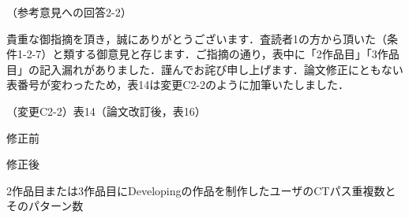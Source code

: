 \documentclass{jarticle} %
\def\subsection#1{ \vspace{1pc} {\gt #1} }
\begin{document}
\subsection{（参考意見への回答2-2）}

貴重な御指摘を頂き，誠にありがとうございます．査読者1の方から頂いた（条件1-2-7）と類する御意見と存じます．ご指摘の通り，表中に「2作品目」「3作品目」の記入漏れがありました．謹んでお詫び申し上げます．論文修正にともない表番号が変わったため，表14は変更C2-2のように加筆いたしました．

\subsection{（変更C2-2）表14（論文改訂後，表16）}
\vspace{-0.3cm}
\begin{description}
\item 修正前\\
\phantom{　}
\renewcommand{\thetable}{\arabic{table}}
\setcounter{table}{13}
\begin{table}[h]
  \caption{2作品目または3作品目にDevelopingの作品を制作したユーザのCTパス重複数とそのパターン数}
  \label{tab:goal-pattern-2}
  \centering
   \vspace{-2mm}
\end{table}
\vspace{-0.3cm}
\item 修正後\\
\phantom{　}
\renewcommand{\thetable}{\arabic{table}}
\setcounter{table}{15}
\begin{table}[h]
  \caption{2作品目または3作品目にDevelopingの作品を制作したユーザのCTパス重複数とそのパターン数}
  \label{tab:goal-pattern-2}
  \centering

\end{table}
\end{description}
\end{document}
